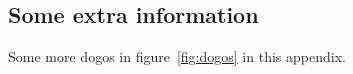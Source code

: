\documentclass[12pt, a4paper, oneside]{article}
\begin{document}
\blindtext[3]

\clearpage


\nocite{*}

{
    \raggedright
    \printbibliography
}

\clearpage


\appendix
{} \label{sec:appendix}

\renewcommand{\thesubsection}{\Alph{subsection}}



\subsection{Some extra information} \label{appendix:extra}

Some more dogos in figure~\ref{fig:dogos} in this appendix. \medskip
\end{document}
